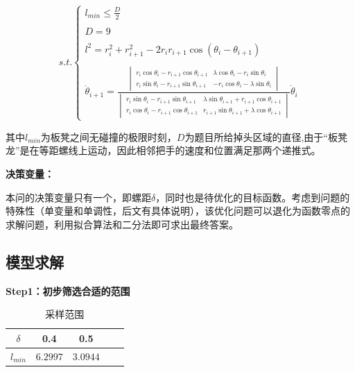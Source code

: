 \documentclass[withoutpreface,bwprint]{cumcmthesis}
\begin{document}
$$
s.t.
\left\{\begin{matrix} l_{min}\le \frac{D}{2}  \\\\D=9 \\\\l^{2} =r_{i} ^{2} +r^{2} _{i+1} -2r_{i} r_{i+1} \cos \left ( \theta _{i}-\theta _{i+1}   \right )  \\ \\\dot{\theta } _{i+1} =      \frac{\begin{vmatrix}  r_{i} \cos \theta _{i}-r_{i+1} \cos \theta _{i+1}   & \lambda \cos \theta _{i} - r_{i}\sin\theta _{i} \\r_{i} \sin \theta _{i}-r_{i+1} \sin \theta _{i+1}  &-r_{i} \cos \theta _{i}-\lambda \sin \theta _{i}\end{vmatrix}  }{\begin{vmatrix}r_{i} \sin \theta _{i}-r_{i+1} \sin \theta _{i+1}  &\lambda  \sin \theta _{i+1}+r _{i+1} \cos \theta _{i+1} \\r_{i} \cos \theta _{i}-r_{i+1} \cos \theta _{i+1}  &r _{i+1} \sin \theta _{i+1}+ \lambda \cos \theta _{i+1}\end{vmatrix}}      \dot{\theta }_{i}\end{matrix}\right.
$$

其中$l_{min}$为板凳之间无碰撞的极限时刻，$D$为题目所给掉头区域的直径,由于“板凳龙”是在等距螺线上运动，因此相邻把手的速度和位置满足那两个递推式。

\textbf{决策变量：} 

本问的决策变量只有一个，即螺距$\delta$，同时也是待优化的目标函数。考虑到问题的特殊性（单变量和单调性，后文有具体说明），该优化问题可以退化为函数零点的求解问题，利用拟合算法和二分法即可求出最终答案。

\subsection{模型求解}

\textbf{Step1：初步筛选合适的范围}


\begin{table}[!ht]
    \centering
    \caption{采样范围}
    \begin{tabular}{ccccc}
     
    \hline
         $\delta$ & 0.4 & 0.5 \\ \hline
         $l_{min}$ &$ 6.2997$ & $3.0944$  \\ \hline
    \end{tabular}
    \label{a}
\end{table}
\end{document}
